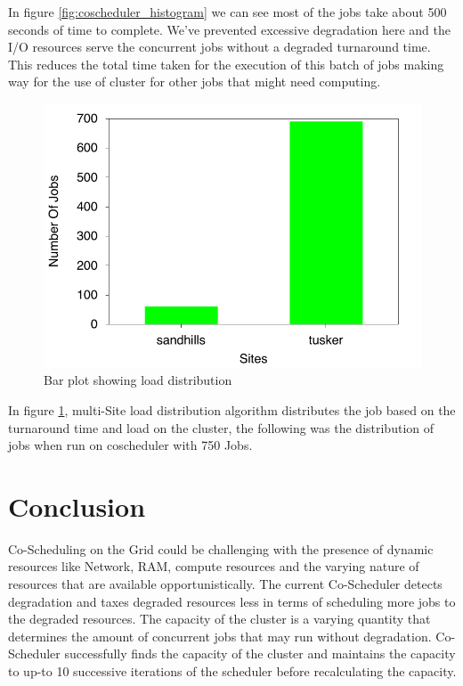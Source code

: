 \documentclass[ms,electronic,double]{nuthesis}
\begin{document}
In figure \ref{fig:coscheduler_histogram} we can see most of the jobs take about 
500 seconds of time to complete. We've prevented excessive degradation here and 
the I/O resources serve the concurrent jobs without a degraded turnaround time. 
This reduces the total time taken for the execution of this batch of jobs 
making way for the use of cluster for other jobs that might need computing.


\begin{figure}[htbp!]
\begin{center}
\includegraphics{images/multisite_load}
\caption{Bar plot showing load distribution}
\label{fig:multisite_load}
\end{center}
\end{figure}
\FloatBarrier


In figure \ref{fig:multisite_load}, multi-Site load distribution algorithm distributes the job based on the 
turnaround time and load on the cluster, the following was the distribution of jobs when run 
on coscheduler with 750 Jobs.


\chapter{Conclusion}

Co-Scheduling on the Grid could be challenging with the presence of dynamic 
resources like Network, RAM, compute resources and the varying nature of resources
that are available opportunistically. The current Co-Scheduler 
detects degradation and taxes degraded resources less in terms of scheduling 
more jobs to the degraded resources. The capacity of the cluster is a varying 
quantity that determines the amount of concurrent jobs that may run without 
degradation. Co-Scheduler successfully finds the capacity of the cluster and 
maintains the capacity to up-to 10 successive iterations of the scheduler before 
recalculating the capacity.
\end{document}
